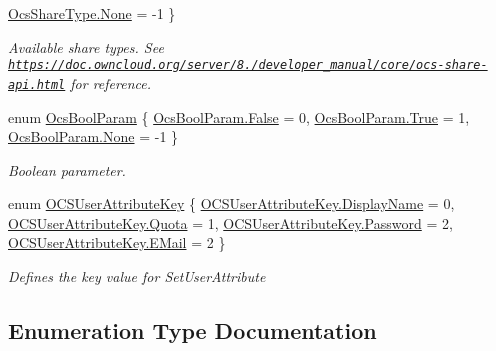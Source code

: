 \begin{DoxyCompactItemize}
\newline
\hyperlink{namespaceowncloudsharp_a51141c9a2e84eaced736ab96ea4b2f0ba6adf97f83acf6453d4a6a4b1070f3754}{Ocs\+Share\+Type.\+None} = -\/1
 \}\begin{DoxyCompactList}\small\item\em Available share types. See {\ttfamily \href{https://doc.owncloud.org/server/8.2/developer_manual/core/ocs-share-api.html}{\tt https\+://doc.\+owncloud.\+org/server/8./developer\+\_\+manual/core/ocs-\/share-\/api.\+html}} for reference. \end{DoxyCompactList}
\item 
enum \hyperlink{namespaceowncloudsharp_a7d494b18f174086318df1bdf916068b5}{Ocs\+Bool\+Param} \{ \hyperlink{namespaceowncloudsharp_a7d494b18f174086318df1bdf916068b5af8320b26d30ab433c5a54546d21f414c}{Ocs\+Bool\+Param.\+False} = 0, 
\hyperlink{namespaceowncloudsharp_a7d494b18f174086318df1bdf916068b5af827cf462f62848df37c5e1e94a4da74}{Ocs\+Bool\+Param.\+True} = 1, 
\hyperlink{namespaceowncloudsharp_a7d494b18f174086318df1bdf916068b5a6adf97f83acf6453d4a6a4b1070f3754}{Ocs\+Bool\+Param.\+None} = -\/1
 \}\begin{DoxyCompactList}\small\item\em Boolean parameter. \end{DoxyCompactList}
\item 
enum \hyperlink{namespaceowncloudsharp_a5896a4bf1799666b1f52193038b27685}{O\+C\+S\+User\+Attribute\+Key} \{ \hyperlink{namespaceowncloudsharp_a5896a4bf1799666b1f52193038b27685a3b868ced6f60acf5ee565ac021d42941}{O\+C\+S\+User\+Attribute\+Key.\+Display\+Name} = 0, 
\hyperlink{namespaceowncloudsharp_a5896a4bf1799666b1f52193038b27685ad2d5c3e087f684e56b5b81d6212d7ccb}{O\+C\+S\+User\+Attribute\+Key.\+Quota} = 1, 
\hyperlink{namespaceowncloudsharp_a5896a4bf1799666b1f52193038b27685adc647eb65e6711e155375218212b3964}{O\+C\+S\+User\+Attribute\+Key.\+Password} = 2, 
\hyperlink{namespaceowncloudsharp_a5896a4bf1799666b1f52193038b27685a1dfcd881b8444c6f3effb453edaf9108}{O\+C\+S\+User\+Attribute\+Key.\+E\+Mail} = 2
 \}\begin{DoxyCompactList}\small\item\em Defines the key value for Set\+User\+Attribute \end{DoxyCompactList}
\end{DoxyCompactItemize}


\subsection{Enumeration Type Documentation}
\mbox{\label{namespaceowncloudsharp_a7d494b18f174086318df1bdf916068b5}} 
